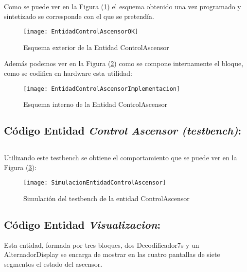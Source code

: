 	\inputminted[frame=lines,fontsize=\footnotesize,linenos]{vhdl}{CodeFiles/EntidadControlAscensor.vhd}

	Como se puede ver en la Figura (\ref{fig:EntidadControlAscensorOK}) el esquema obtenido una vez programado y sintetizado se corresponde con el que se pretendía.
    \begin{figure}[H]
		    \centering
		    \texttt{[image: EntidadControlAscensorOK]}
		    \caption{Esquema exterior de la Entidad ControlAscensor}
		    \label{fig:EntidadControlAscensorOK}
	\end{figure}
    Además podemos ver en la Figura (\ref{fig:EntidadControlAscensorImplementacion}) como se compone internamente el bloque, como se codifica en hardware esta utilidad:
    \begin{figure}[H]
		    \centering
		    \texttt{[image: EntidadControlAscensorImplementacion]}
		    \caption{Esquema interno de la Entidad ControlAscensor}
		    \label{fig:EntidadControlAscensorImplementacion}
	\end{figure}

\subsection{Código Entidad \textit{Control Ascensor (testbench)}:} \label{code:ControlAscensor_tb}
	\inputminted[frame=lines,fontsize=\footnotesize,linenos]{vhdl}{CodeFiles/EntidadControlAscensor_tb.vhd}

    Utilizando este testbench se obtiene el comportamiento que se puede ver en la Figura (\ref{fig:SimulacionEntidadControlAscensor}):

    \begin{figure}[H]
		    \centering
		    \texttt{[image: SimulacionEntidadControlAscensor]}
		    \caption{Simulación del testbench de la entidad ControlAscensor}
		    \label{fig:SimulacionEntidadControlAscensor}
	\end{figure}

\subsection{Código Entidad \textit{Visualizacion}:} \label{code:Visualizacion}

Esta entidad, formada por tres bloques, dos Decodificador7s y un AlternadorDisplay se encarga de mostrar en las cuatro pantallas de siete segmentos el estado del ascensor. \\ 
	\inputminted[frame=lines,fontsize=\footnotesize,linenos]{vhdl}{CodeFiles/EntidadVisualizacion.vhd}


